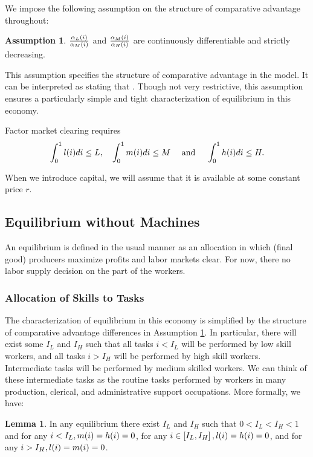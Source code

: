 \documentclass[12pt]{article}
\newcommand{\highlightB}[1]{{\emph{\color{MyBlue}{#1}}}}
\theoremstyle{definition}
\newtheorem{assumption}{Assumption}
\newtheorem{lemma}[theorem]{Lemma}
\begin{document}
We impose the following assumption on the structure of comparative advantage throughout:
\begin{assumption} \label{task_model_ass_comparative_advantage}
	$\frac{\alpha_L{\left( i \right)}}{\alpha_M{\left( i \right)}}$ and $\frac{\alpha_M{\left( i \right)}}{\alpha_H{\left( i \right)}}$ are continuously differentiable and strictly decreasing.
\end{assumption}
This assumption specifies the structure of comparative advantage in the model. It can be interpreted as stating that \highlightB{higher indices correspond to ``more complex'' tasks in which high skill workers are better than medium skill workers and medium skill workers are better than low skill workers}. Though not very restrictive, this assumption ensures a particularly simple and tight characterization of equilibrium in this economy.

Factor market clearing requires
\begin{equation}
    \label{task_model_market_clearing}
	\int_0^1 l{\left( i \right)} d i \leq L, \quad \int_0^1 m{\left( i \right)} d i \leq M \quad \text { and } \quad \int_0^1 h{\left( i \right)} d i \leq H .
\end{equation}

When we introduce capital, we will assume that it is available at some constant price $r$.

\subsection{Equilibrium without Machines}

An equilibrium is defined in the usual manner as an allocation in which (final good) producers maximize profits and labor markets clear. For now, there no labor supply decision on the part of the workers.

\subsubsection{Allocation of Skills to Tasks}

The characterization of equilibrium in this economy is simplified by the structure of comparative advantage differences in Assumption \ref{task_model_ass_comparative_advantage}. In particular, there will exist some $I_L$ and $I_H$ such that all tasks $i < I_L$ will be performed by low skill workers, and all tasks $i > I_H$ will be performed by high skill workers. Intermediate tasks will be performed by medium skilled workers. We can think of these intermediate tasks as the routine tasks performed by workers in many production, clerical, and administrative support occupations. More formally, we have:
\begin{lemma} \label{task_model_lemma1}
	In any equilibrium there exist $I_L$ and $I_H$ such that $0 < I_L < I_H < 1$ and for any $i < I_L , m{\left( i \right)} = h {\left( i \right)} = 0$, for any $i \in \left[ I_L , I_H \right], l {\left( i \right)} = h {\left( i \right)} = 0$, and for any $i > I_H , l{\left( i \right)} = m{\left( i \right)} = 0$.
\end{lemma}
\end{document}
